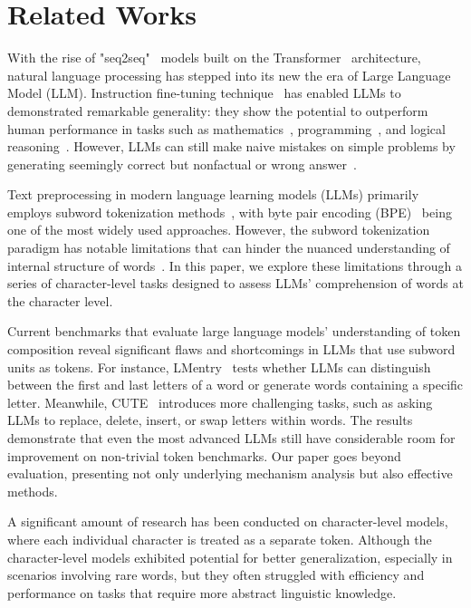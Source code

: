 \section{Related Works}
With the rise of "seq2seq"~\cite{seq2014} models built on the Transformer~\cite{attention2017} architecture, natural language processing has stepped into its new the era of Large Language Model (LLM). Instruction fine-tuning technique~\cite{language2020} has enabled LLMs to demonstrated remarkable generality: they show the potential to outperform human performance in tasks such as mathematics~\cite{math2024}, programming~\cite{programming2023}, and logical reasoning~\cite{logicbench2024}. However, LLMs can still make naive mistakes on simple problems by generating seemingly correct but nonfactual or wrong answer~\cite{hallucination2024}.

Text preprocessing in modern language learning models (LLMs) primarily employs subword tokenization methods~\cite{google2016, subword2018}, with byte pair encoding (BPE)~\cite{neural2016} being one of the most widely used approaches. However, the subword tokenization paradigm has notable limitations that can hinder the nuanced understanding of internal structure of words~\cite{tokenization2024}. In this paper, we explore these limitations through a series of character-level tasks designed to assess LLMs' comprehension of words at the character level.

Current benchmarks that evaluate large language models' understanding of token composition reveal significant flaws and shortcomings in LLMs that use subword units as tokens. For instance, LMentry~\cite{lmentry2022} tests whether LLMs can distinguish between the first and last letters of a word or generate words containing a specific letter. Meanwhile, CUTE~\cite{cute2024} introduces more challenging tasks, such as asking LLMs to replace, delete, insert, or swap letters within words. The results demonstrate that even the most advanced LLMs still have considerable room for improvement on non-trivial token benchmarks. Our paper goes beyond evaluation, presenting not only underlying mechanism analysis but also effective methods.

A significant amount of research has been conducted on character-level models, where each individual character is treated as a separate token. Although the character-level models exhibited potential for better generalization, especially in scenarios involving rare words, but they often struggled with efficiency and performance on tasks that require more abstract linguistic knowledge.
